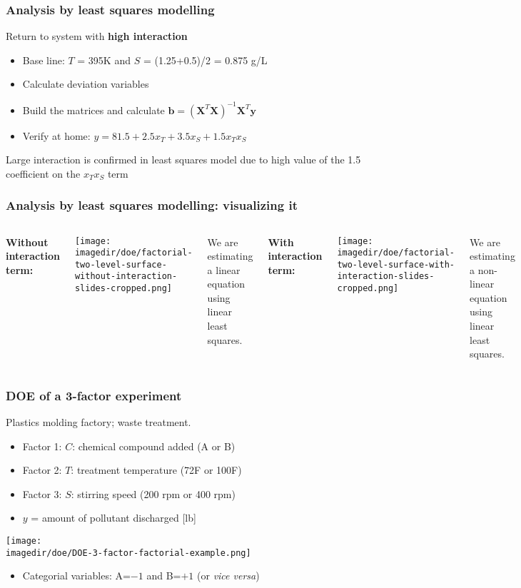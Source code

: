 \begin{frame}\frametitle{Analysis by least squares modelling}

	Return to system with \textbf{high interaction}
	\begin{itemize}
		\item	Base line: $T$ = 395K and $S$ = (1.25+0.5)/2 = 0.875 g/L
		\item	Calculate deviation variables
		\item	Build the matrices and calculate $\mathbf{b} = (\mathbf{X}^T\mathbf{X})^{-1}\mathbf{X}^T\mathbf{y}$
		\item	Verify at home: $y = 81.5 + 2.5 x_T + 3.5 x_S + 1.5 x_T x_S$
	\end{itemize}
	
	\vspace{12pt}
	Large interaction is confirmed in least squares model due to high value of the 1.5 coefficient on the $x_T x_S$ term
\end{frame}

\begin{frame}\frametitle{Analysis by least squares modelling: visualizing it}
	\begin{columns}
		\column{5cm} 
			\textbf{Without interaction term:}
			\begin{center}
				\texttt{[image: \\imagedir/doe/factorial-two-level-surface-without-interaction-slides-cropped.png]}
			\end{center}
			We are estimating a linear equation using linear least squares. 
		
		\column{5cm} 
			\textbf{With interaction term:}
			\begin{center}
				\texttt{[image: \\imagedir/doe/factorial-two-level-surface-with-interaction-slides-cropped.png]}
			\end{center}
			We are estimating a non-linear equation using linear least squares.
	\end{columns}
\end{frame}

\begin{frame}\frametitle{DOE of a 3-factor experiment}

	Plastics molding factory; waste treatment.
	\begin{itemize}
		\item	Factor 1: $C$: chemical compound added (A or B)
		\item	Factor 2: $T$: treatment temperature (72F or 100F)
		\item	Factor 3: $S$: stirring speed (200 rpm or 400 rpm)
		\item	$y$ = amount of pollutant discharged [lb]
	\end{itemize}
	\begin{center}
		\texttt{[image: \\imagedir/doe/DOE-3-factor-factorial-example.png]}
	\end{center}
	\begin{itemize}
		\item	Categorial variables: A=$-1$ and B=$+1$ (or \emph{vice versa})
	\end{itemize}
\end{frame}

